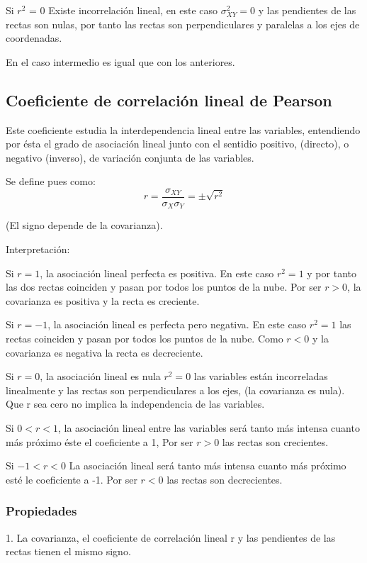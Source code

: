 \documentclass{article}
\begin{document}
Si $r^2$ = 0 Existe incorrelación lineal, en este caso $\sigma_{XY}^2 = 0$ y las pendientes de las rectas son nulas, por tanto las rectas son perpendiculares y paralelas a los ejes de coordenadas.

En el caso intermedio es igual que con los anteriores.

\subsection{Coeficiente de correlación lineal de Pearson}

Este coeficiente estudia la interdependencia lineal entre las variables, entendiendo por ésta el grado de asociación lineal junto con el sentidio positivo, (directo), o negativo (inverso), de variación conjunta de las variables.

Se define pues como:
$$ r = \frac{\sigma_{XY}}{\sigma_{X} \sigma_{Y}}  = \pm \sqrt{r^2}$$

(El signo depende de la covarianza).

Interpretación:

Si $r = 1$, la asociación lineal perfecta es positiva. En este caso $r^2 = 1$ y por tanto las dos rectas coinciden y pasan por todos los puntos de la nube. Por ser $r > 0$, la covarianza es positiva y la recta es creciente.

Si $r= -1$, la asociación lineal es perfecta pero negativa. En este caso $r^2 = 1$ las rectas coinciden y pasan por todos los puntos de la nube. Como $r < 0$ y la covarianza es negativa la recta es decreciente.


Si $r = 0$, la asociación lineal es nula $r^2 = 0$ las variables están incorreladas linealmente y las rectas son perpendiculares a los ejes, (la covarianza es nula).  Que r sea cero no implica la independencia de las variables.

Si $ 0 < r < 1 $, la asociación lineal entre las variables será tanto más intensa cuanto más próximo éste el coeficiente a 1, Por ser $ r > 0 $ las rectas son crecientes.

Si $ -1 < r < 0 $ La asociación lineal será tanto más intensa cuanto más próximo esté le coeficiente a -1. Por ser $ r < 0$ las rectas son decrecientes.

\subsubsection{Propiedades}

1. La covarianza, el coeficiente de correlación lineal r y las pendientes de las rectas tienen el mismo signo.
\end{document}
